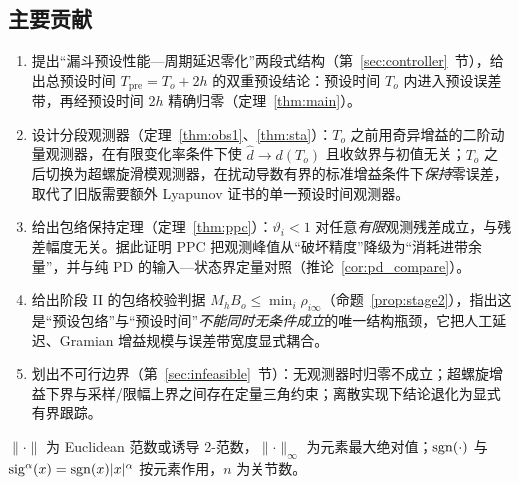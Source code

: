 \subsection{主要贡献}
\begin{enumerate}
  \item 提出“漏斗预设性能—周期延迟零化”两段式结构（第~\ref{sec:controller}~节），给出总预设时间 \(T_{\mathrm{pre}}=T_o+2h\) 的双重预设结论：预设时间 \(T_o\) 内进入预设误差带，再经预设时间 \(2h\) 精确归零（定理~\ref{thm:main}）。
  \item 设计分段观测器（定理~\ref{thm:obs1}、\ref{thm:sta}）：\(T_o\) 之前用奇异增益的二阶动量观测器，在有限变化率条件下使 \(\hat d\to d(T_o)\) 且收敛界与初值无关；\(T_o\) 之后切换为超螺旋滑模观测器，在扰动导数有界的标准增益条件下\emph{保持}零误差，取代了旧版需要额外 Lyapunov 证书的单一预设时间观测器。
  \item 给出包络保持定理（定理~\ref{thm:ppc}）：\(\vartheta_i<1\) 对任意\emph{有限}观测残差成立，与残差幅度无关。据此证明 PPC 把观测峰值从“破坏精度”降级为“消耗进带余量”，并与纯 PD 的输入—状态界定量对照（推论~\ref{cor:pd_compare}）。
  \item 给出阶段 II 的包络校验判据 \(M_hB_o\le\min_i\rho_{i\infty}\)（命题~\ref{prop:stage2}），指出这是“预设包络”与“预设时间”\emph{不能同时无条件成立}的唯一结构瓶颈，它把人工延迟、Gramian 增益规模与误差带宽度显式耦合。
  \item 划出不可行边界（第~\ref{sec:infeasible}~节）：无观测器时归零不成立；超螺旋增益下界与采样/限幅上界之间存在定量三角约束；离散实现下结论退化为显式有界跟踪。
\end{enumerate}

\(\lVert\cdot\rVert\) 为 Euclidean 范数或诱导 2-范数，\(\lVert\cdot\rVert_\infty\) 为元素最大绝对值；\(\operatorname{sgn}(\cdot)\) 与 \(\operatorname{sig}^{\alpha}(x)=\operatorname{sgn}(x)\lvert x\rvert^{\alpha}\) 按元素作用，\(n\) 为关节数。
